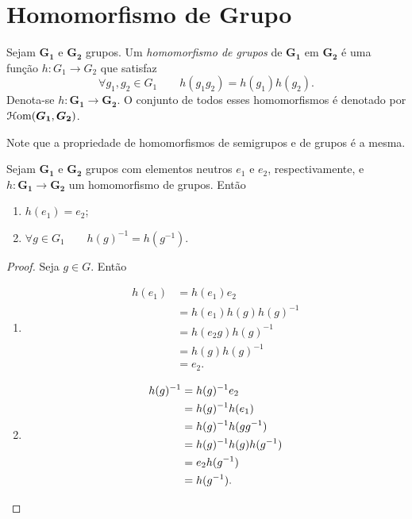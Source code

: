 \section{Homomorfismo de Grupo}

\begin{defi}
Sejam $\bm{G_1}$ e $\bm{G_2}$ grupos. Um \emph{homomorfismo de grupos} de $\bm{G_1}$ em $\bm{G_2}$ é uma função $h: G_1 \to G_2$ que satisfaz
	\begin{equation*}
	\forall g_1,g_2 \in G_1 \qquad h(g_1g_2)=h(g_1)h(g_2).
	\end{equation*}
Denota-se $h: \bm{G_1} \to \bm{G_2}$. O conjunto de todos esses homomorfismos é denotado por $\mathcal{H}\mathrm{om}(\bm{G_1},\bm{G_2})$.
\end{defi}

Note que a propriedade de homomorfismos de semigrupos e de grupos é a mesma.

\begin{prop}
\label{prop.hom.gru}
Sejam $\bm{G_1}$ e $\bm{G_2}$ grupos com elementos neutros $e_1$ e $e_2$, respectivamente, e $h: \bm{G_1} \to \bm{G_2}$ um homomorfismo de grupos. Então
	\begin{enumerate}
	\item $h(e_1)=e_2$;
	\item $\forall g \in G_1 \qquad h(g)^{-1}=h(g^{-1})$.
	\end{enumerate}
\end{prop}
\begin{proof}
Seja $g \in G$. Então
	\begin{enumerate}
	\item
		\begin{align*}
		h(e_1) &= h(e_1) e_2 \\
			&= h(e_1) h(g) h(g)^{-1} \\
			&= h(e_2 g) h(g)^{-1} \\
			&= h(g) h(g)^{-1} \\
			&= e_2.
		\end{align*}
	\item
		\begin{align*}
		h(g)^{-1} &= h(g)^{-1} e_2 \\
			&= h(g)^{-1} h(e_1) \\
			&= h(g)^{-1} h(g g^{-1}) \\
			&= h(g)^{-1} h(g) h(g^{-1}) \\
			&= e_2 h(g^{-1}) \\
			&= h(g^{-1}). \qedhere
		\end{align*}
	\end{enumerate}
\end{proof}


